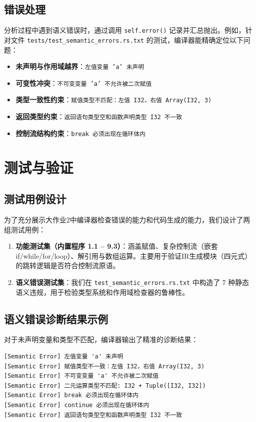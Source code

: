 \documentclass[12pt,a4paper]{ctexart}
\begin{document}
\subsection{错误处理}

分析过程中遇到语义错误时，通过调用 \texttt{self.error()} 记录并汇总抛出。例如，针对文件 \texttt{tests/test\_semantic\_errors.rs.txt} 的测试，编译器能精确定位以下问题：

\begin{itemize}
    \item \textbf{未声明与作用域越界}：\texttt{左值变量 'a' 未声明}
    \item \textbf{可变性冲突}：\texttt{不可变变量 'a' 不允许被二次赋值}
    \item \textbf{类型一致性约束}：\texttt{赋值类型不匹配：左值 I32，右值 Array(I32, 3)}
    \item \textbf{返回类型约束}：\texttt{返回语句类型空和函数声明类型 I32 不一致}
    \item \textbf{控制流结构约束}：\texttt{break 必须出现在循环体内}
\end{itemize}


\section{测试与验证}

\subsection{测试用例设计}

为了充分展示大作业2中编译器检查错误的能力和代码生成的能力，我们设计了两组测试用例：
\begin{enumerate}
    \item \textbf{功能测试集（内置程序 1.1 -- 9.3）}：涵盖赋值、复杂控制流（嵌套if/while/for/loop）、解引用与数组运算。主要用于验证IR生成模块（四元式）的跳转逻辑是否符合控制流原语。
    \item \textbf{语义错误测试集}：我们在 \texttt{test\_semantic\_errors.rs.txt} 中构造了 7 种静态语义违规，用于检验类型系统和作用域检查器的鲁棒性。
\end{enumerate}

\subsection{语义错误诊断结果示例}

对于未声明变量和类型不匹配，编译器输出了精准的诊断结果：
\begin{lstlisting}[basicstyle=\footnotesize\ttfamily]
[Semantic Error] 左值变量 'a' 未声明
[Semantic Error] 赋值类型不一致：左值 I32，右值 Array(I32, 3)
[Semantic Error] 不可变变量 'a' 不允许被二次赋值
[Semantic Error] 二元运算类型不匹配: I32 + Tuple([I32, I32])
[Semantic Error] break 必须出现在循环体内
[Semantic Error] continue 必须出现在循环体内
[Semantic Error] 返回语句类型空和函数声明类型 I32 不一致
\end{lstlisting}
\end{document}
